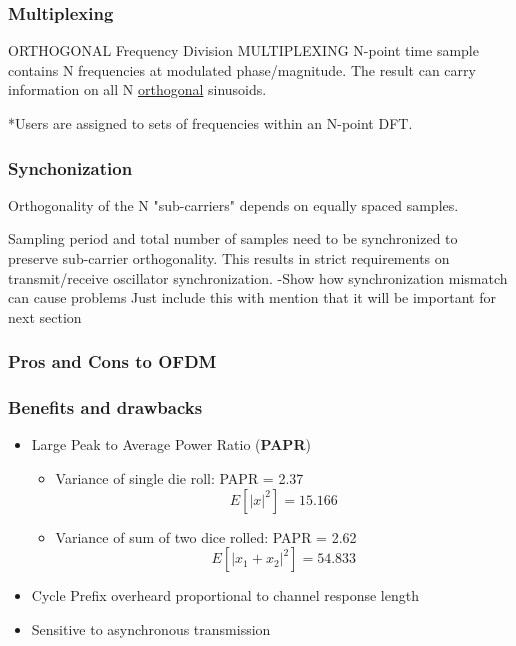 \documentclass{beamer}
\begin{document}
\begin{frame}
	\frametitle{Multiplexing}
	\begin{block}{ORTHOGONAL Frequency Division MULTIPLEXING}
		N-point time sample contains N frequencies at modulated phase/magnitude. 
		The result can carry information on all N \underline{orthogonal} sinusoids.
	\end{block}
	*Users are assigned to sets of frequencies within an N-point DFT.
\end{frame}

\begin{frame}
	\frametitle{Synchonization }
	Orthogonality of the N "sub-carriers" depends on equally spaced samples.

	Sampling period and total number of samples need to be synchronized to preserve sub-carrier orthogonality. 
	This results in strict requirements on transmit/receive oscillator synchronization.
	-Show how synchronization mismatch can cause problems
	Just include this with mention that it will be important for next section
	\cite{sandell1995timing}
\end{frame}



\subsubsection{Pros and Cons to OFDM}

\begin{frame}
	\frametitle{Benefits and drawbacks}
	\begin{itemize}
		\item Large Peak to Average Power Ratio (\textbf{PAPR})
			\begin{itemize}
				\item{Variance of single die roll: PAPR = 2.37
					\begin{equation}
						E[|x|^2] = 15.166
					\end{equation}}

				\item{Variance of sum of two dice rolled: PAPR = 2.62
					\begin{equation}
						E[|x_1+x_2|^2] = 54.833
					\end{equation}}
			\end{itemize}
		
		\item Cycle Prefix overheard proportional to channel response length

		\item Sensitive to asynchronous transmission

	\end{itemize}
\end{frame}
\end{document}
